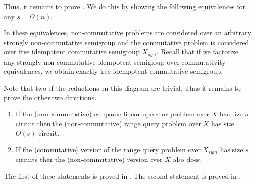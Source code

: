 \documentclass{toc}
\begin{document}
Thus, it remains to prove . We do this by showing
the following equivalences for any $s = \Omega(n)$.

\vspace{2mm}
\begin{center}
\end{center}
\vspace{2mm}

In these equivalences, non-commutative problems are considered over an arbitrary
strongly non-commutative semigroup and the commutative problem is considered
over free idempotent commutative semigroup $X_{sym}$. Recall that
if we factorize any strongly non-commutative idempotent semigroup over
commutativity equivalences, we obtain exactly free idempotent commutative
semigroup.

Note that two of the reductions on this diagram are trivial. Thus it remains to prove the other two directions.

%
%
%
%
%
%


\begin{enumerate}
	\item If the (non-commutative)
    co-sparse
    linear operator problem over $X$ has size $s$
	circuit then the (non-commutative)
	range query
	problem over $X$ has size
	$O(s)$ circuit.
	\item If the (commutative) version of the
	range query
	problem over $X_{sym}$ has
	size $s$ circuits then the (non-commutative) version over $X$ also does.
\end{enumerate}

The first of these statements is proved in  .
The second statement is proved in .
\end{document}
